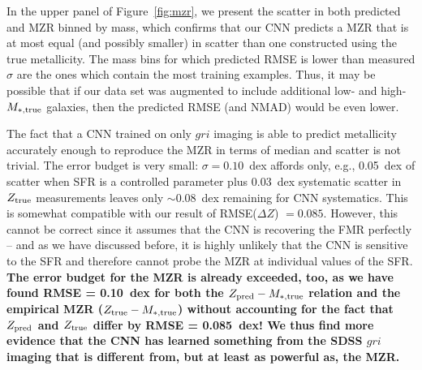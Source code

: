 \documentclass[fleqn,usenatbib]{mnras}
\begin{document}
In the upper panel of Figure~\ref{fig:mzr}, we present the scatter in both predicted and \cite{2004ApJ...613..898T} MZR binned by mass, which confirms that our CNN predicts a MZR that is at most equal (and possibly smaller) in scatter than one constructed using the true metallicity.
The mass bins for which predicted RMSE is lower than measured $\sigma$ are the ones which contain the most training examples.
Thus, it may be possible that if our data set was augmented to include additional low- and high-$M_{\rm \ast,true}$ galaxies, then the predicted RMSE (and NMAD) would be even lower.

The fact that a CNN trained on only $gri$ imaging is able to predict metallicity accurately enough to reproduce the MZR in terms of median and scatter is not trivial.
The error budget is very small: $\sigma = 0.10$~dex affords only, e.g., 0.05~dex of scatter when SFR is a controlled parameter plus 0.03~dex systematic scatter in $Z_{\rm true}$ measurements leaves only $\sim 0.08$~dex remaining for CNN systematics.
This is somewhat compatible with our result of RMSE($\Delta Z$) $= 0.085$.
However, this cannot be correct since it assumes that the CNN is recovering the FMR perfectly -- and as we have discussed before, it is highly unlikely that the CNN is sensitive to the SFR and therefore cannot probe the MZR at individual values of the SFR.
\textbf{The error budget for the MZR is already exceeded, too, as we have found RMSE = 0.10~dex for both the $Z_{\rm pred}-M_{\ast,\rm true}$ relation and the empirical MZR ($Z_{\rm true}-M_{\ast,\rm true}$) without accounting for the fact that $Z_{\rm pred}$ and $Z_{\rm true}$ differ by RMSE = 0.085~dex!
We thus find more evidence that the CNN has learned something from the SDSS $gri$ imaging that is different from, but at least as powerful as, the MZR.}





%
\end{document}
